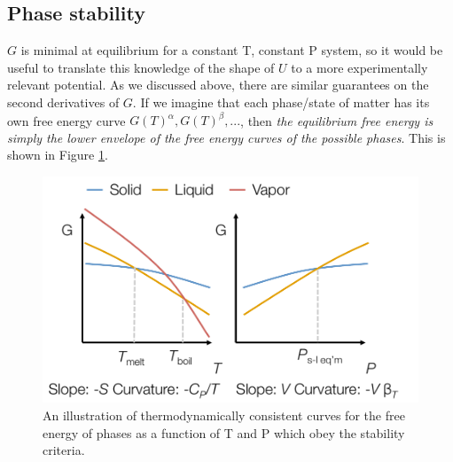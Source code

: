 \documentclass[12pt]{article}
\begin{document}
\subsection{Phase stability}
$G$ is minimal at equilibrium for a constant T, constant P system, so it would be useful to translate this knowledge of the shape of $U$ to a more experimentally relevant potential. As we discussed above, there are similar guarantees on the second derivatives of $G$. 
If we imagine that each phase/state of matter has its own free energy curve $G(T)^{\alpha},G(T)^{\beta},...$, then \emph{the equilibrium free energy is simply the lower envelope of the free energy curves of the possible phases}. This is shown in Figure \ref{phaseGCurves}.
\begin{figure}[h]
\centering
\includegraphics[width=12cm]{G_Curves_For_Phases}
\caption{An illustration of thermodynamically consistent curves for the free energy of phases as a function of T and P which obey the stability criteria.}
\label{phaseGCurves}
\end{figure}
\end{document}
